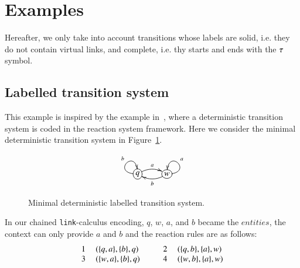 \section{Examples}
\label{ex:examples}
Hereafter, we only take into account transitions whose labels are solid, i.e. they do not contain 
virtual links, and   complete, i.e. thy starts and ends with the $\tau$ symbol.\\

\subsection{Labelled transition system}
This example is inspired by the example in~\cite{BEMR11}, where
a deterministic transition system is coded in the reaction system
framework.
Here we consider the minimal deterministic transition system in Figure~\ref{fig:lts}.
\begin{figure}
\[
\xymatrix{
*+[o][F-]{q} \ar@/ ^/[r]^a \ar@(l,u)[]^b &
*+[o][F-]{w} \ar@/^/[l]^b \ar@(r,u)[]_a
}
\]
\caption{Minimal deterministic labelled transition system.}
\label{fig:lts}
\end{figure}
\noindent
In our chained {\tt link}-calculus encoding, $q$, $w$, $a$, and $b$ became the $entities$, the context can only provide $a$ and $b$ and the reaction rules are as follows:\\
\[
\begin{array}{cl@{\hspace{1cm}} cl}
1 \ &(\{q,a\},\{b\},q) & 2\ &(\{q,b\},\{a\},w)\\
3 \  &(\{w,a\},\{b\},q) & 4\ &(\{w,b\},\{a\},w)\\ 
\end{array}
\]

